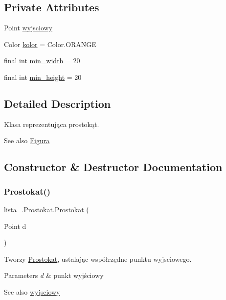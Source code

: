 \subsection*{Private Attributes}
\begin{DoxyCompactItemize}
\item 
Point \mbox{\hyperlink{classlista__5_1_1_prostokat_adde334d6e8c665362e02745b04bec40d}{wyjsciowy}}
\item 
Color \mbox{\hyperlink{classlista__5_1_1_prostokat_ad4564e93752646ac3267d2f559c25907}{kolor}} = Color.\+O\+R\+A\+N\+GE
\item 
final int \mbox{\hyperlink{classlista__5_1_1_prostokat_a091fff7a1557fe594f834863d888be0c}{min\+\_\+width}} = 20
\item 
final int \mbox{\hyperlink{classlista__5_1_1_prostokat_acf9d581dee47e46a8139bda38d1993d6}{min\+\_\+height}} = 20
\end{DoxyCompactItemize}


\subsection{Detailed Description}
Klasa reprezentująca prostokąt. \begin{DoxySeeAlso}{See also}
\mbox{\hyperlink{interfacelista__5_1_1_figura}{Figura}} 
\end{DoxySeeAlso}


\subsection{Constructor \& Destructor Documentation}
\mbox{\label{classlista__5_1_1_prostokat_acc8c546649b600148d733120799f0df6}} 
\subsubsection{\texorpdfstring{Prostokat()}{Prostokat()}}
{\footnotesize\ttfamily lista\+\_.\+Prostokat.\+Prostokat (\begin{DoxyParamCaption}\item[{Point}]{d }\end{DoxyParamCaption})}

Tworzy \mbox{\hyperlink{classlista__5_1_1_prostokat}{Prostokat}}, ustalając współrzędne punktu wyjsciowego. 
\begin{DoxyParams}{Parameters}
{\em d} & punkt wyjściowy \\
\hline
\end{DoxyParams}
\begin{DoxySeeAlso}{See also}
\mbox{\hyperlink{classlista__5_1_1_prostokat_adde334d6e8c665362e02745b04bec40d}{wyjsciowy}} 
\end{DoxySeeAlso}


